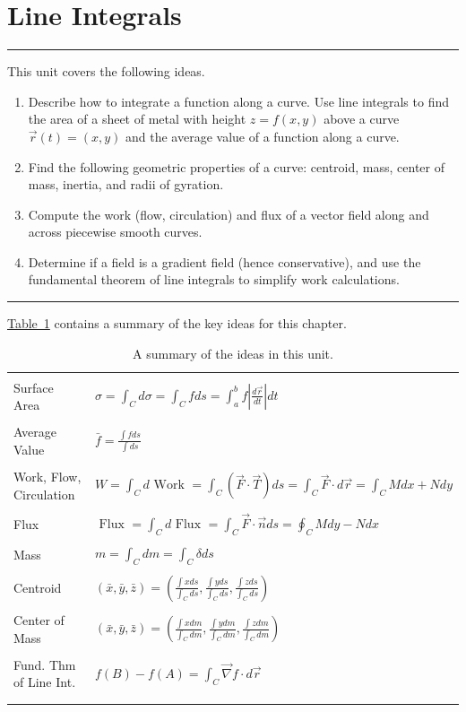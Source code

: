 \documentclass[10pt,]{book}
\theoremstyle{plain}
\theoremstyle{definition}
\theoremstyle{definition}
\theoremstyle{definition}
\theoremstyle{definition}
\newenvironment{objectives}[1]{\noindent\rule{\linewidth}{0.1ex}\newline{\textbf{{\large#1}}\par\smallskip}}{\par\noindent\rule{\linewidth}{0.1ex}\par\smallskip}
\theoremstyle{definition}
\numberwithin{equation}{section}
\newcommand{\hrulethin}  {\noalign{\hrule height 0.04em}}
\newcommand{\hrulemedium}{\noalign{\hrule height 0.07em}}
\begin{document}
\chapter[{Line Integrals}]{Line Integrals}\label{chapter-9}
\begin{objectives}{Objectives}\label{objectives-21}
This unit covers the following ideas.%
%
\begin{enumerate}
\item\hypertarget{li-130}{}Describe how to integrate a function along a curve. Use line integrals to find the area of a sheet of metal with height \(z=f(x,y)\) above a curve \(\vec r(t)=\left(x,y\right)\) and the average value of a function along a curve.%
\item\hypertarget{li-131}{}Find the following geometric properties of a curve: centroid, mass, center of mass, inertia, and radii of gyration.%
\item\hypertarget{li-132}{}Compute the work (flow, circulation) and flux of a vector field along and across piecewise smooth curves.%
\item\hypertarget{li-133}{}Determine if a field is a gradient field (hence conservative), and use the fundamental theorem of line integrals to simplify work calculations.%
\end{enumerate}
\end{objectives}
\hyperref[line_integral_summary]{Table~1} contains a summary of the key ideas for this chapter.%
\begin{table}
\centering
\begin{tabular}{ll}
&\tabularnewline\hrulethin
Surface Area&\(\sigma = \int_C d\sigma=\int_C f ds = \int_a^b f \left|\frac{d\vec r}{dt}\right|dt\)\tabularnewline[0pt]
&\tabularnewline\hrulethin
Average Value&\(\bar f = \frac{\int f ds}{\int ds}\)\tabularnewline[0pt]
&\tabularnewline\hrulethin
Work, Flow, Circulation&\(W=\int_C d\text{ Work }  = \int_C (\vec F\cdot \vec T) ds = \int_C \vec F\cdot d\vec r = \int_C Mdx+Ndy\)\tabularnewline[0pt]
&\tabularnewline\hrulethin
Flux&\(\text{ Flux }  = \int_C d\text{ Flux }  = \int_C \vec F\cdot \vec n ds = \oint_C Mdy-Ndx\)\tabularnewline[0pt]
&\tabularnewline\hrulethin
Mass&\(m=\int_C dm = \int_C \delta ds\)\tabularnewline[0pt]
&\tabularnewline\hrulethin
Centroid&\(\left(\bar x,\bar y,\bar z\right) =\left(\frac{\int x ds}{\int_C ds},\frac{\int y ds}{\int_C ds},\frac{\int z ds}{\int_C ds}\right)\)\tabularnewline[0pt]
&\tabularnewline\hrulethin
Center of Mass&\(\left(\bar x,\bar y,\bar z\right) =\left(\frac{\int x dm}{\int_C dm},\frac{\int y dm}{\int_C dm},\frac{\int z dm}{\int_C dm}\right)\)\tabularnewline[0pt]
&\tabularnewline\hrulemedium
Fund. Thm of Line Int.&\(f(B)-f(A)=\int_C \vec \nabla f \cdot d\vec r\)\tabularnewline[0pt]
&\tabularnewline\hrulethin
\end{tabular}
\caption{A summary of the ideas in this unit.\label{line_integral_summary}}
\end{table}
\end{document}
